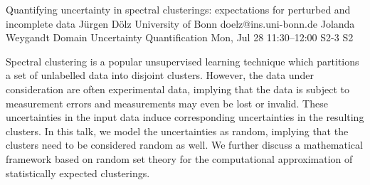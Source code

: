 \documentclass[12pt,lettersize,oneside]{book} %
\begin{document}
\begin{talk}
\end{talk}

\begin{talk}
  {Quantifying uncertainty in spectral clusterings: expectations for perturbed and incomplete data}%
  {J\"urgen D\"olz}%
  {University of Bonn}%
  {doelz@ins.uni-bonn.de}%
  {Jolanda Weygandt}%
  {Domain Uncertainty Quantification}%
  {Mon, Jul 28 11:30--12:00}%
  {S2-3}%
  {S2}%
    
   
Spectral clustering is a popular unsupervised learning technique which partitions a set of unlabelled data into disjoint clusters. However, the data under consideration are often experimental data, implying that the data is subject to measurement errors and measurements may even be lost or invalid. These uncertainties in the input data induce corresponding uncertainties in the resulting clusters. In this talk, we model the uncertainties as random, implying that the clusters need to be considered random as well. We further discuss a mathematical framework based on random set theory for the computational approximation of statistically expected clusterings.
\end{talk}
\end{document}
